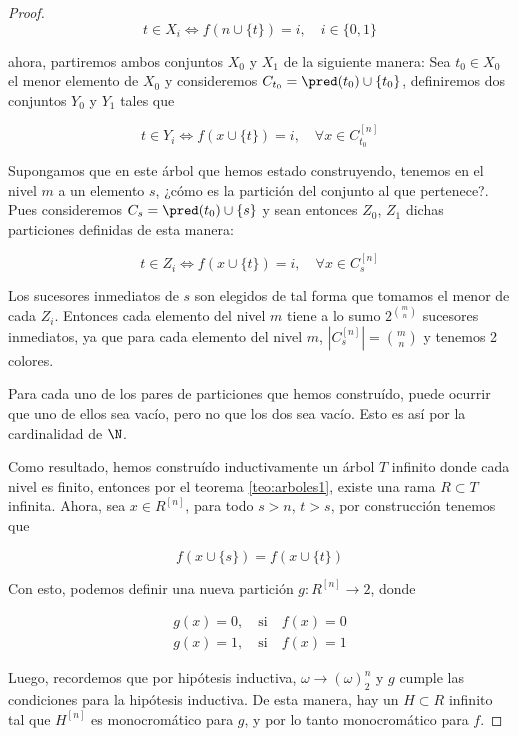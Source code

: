 \begin{proof}
    \[
    t \in X_i \iff f\left( n \cup \{t\} \right) = i, \quad i \in \{0,1\}
    \]
      
    \noindent ahora, partiremos ambos conjuntos $X_0$ y $X_1$ de la siguiente manera: Sea $t_0 \in X_0$ el menor elemento de $X_0$ y consideremos $C_{t_0} = \pred(t_0) \cup \{t_0\}$, definiremos dos conjuntos $Y_0$ y $Y_1$ tales que
    
    \[
    t \in Y_i \iff f\left( x \cup \{t\} \right) = i, \quad \forall x \in C_{t_0}^{[n]}
    \]
    
    Supongamos que en este árbol que hemos estado construyendo, tenemos en el nivel $m$ a un elemento $s$, ¿cómo es la partición del conjunto al que pertenece?. Pues consideremos $C_{s} = \pred(t_0) \cup \{s\}$ y sean entonces $Z_0$, $Z_1$ dichas particiones definidas de esta manera:
    
    \[
    t \in Z_i \iff f\left( x \cup \{t\} \right) = i, \quad \forall x \in C_{s}^{[n]}
    \]
    
    Los sucesores inmediatos de $s$ son elegidos de tal forma que tomamos el menor de cada $Z_i$. Entonces cada elemento del nivel $m$ tiene a lo sumo $2^{\binom{m}{n}}$ sucesores inmediatos, ya que para cada elemento del nivel $m$, $\left| C_s^{[n]} \right| = \binom{m}{n}$ y tenemos 2 colores.
    
    Para cada uno de los pares de particiones que hemos construído, puede ocurrir que uno de ellos sea vacío, pero no que los dos sea vacío. Esto es así por la cardinalidad de $\N$.
    
    Como resultado, hemos construído inductivamente un árbol $T$ infinito donde cada nivel es finito, entonces por el teorema \ref{teo:arboles1}, existe una rama $R \subset T$ infinita. Ahora, sea $x \in R^{[n]}$, para todo $s > n$, $t > s$, por construcción tenemos que
    
    \[
    f\left(x \cup \{s\}\right) = f\left(x \cup \{t\}\right)
    \]
    
    Con esto, podemos definir una nueva partición $g: R^{[n]} \rightarrow 2$, donde
    
    \begin{gather*}
        g(x) = 0, \quad \text{si} \quad f(x) = 0 \\
        g(x) = 1, \quad \text{si} \quad f(x) = 1
    \end{gather*}
    
    Luego, recordemos que por hipótesis inductiva, $\omega \rightarrow (\omega)_2^{n}$ y $g$ cumple las condiciones para la hipótesis inductiva. De esta manera, hay un $H \subset R$ infinito tal que $H^{[n]}$ es monocromático para $g$, y por lo tanto monocromático para $f$.
    

\end{proof}
